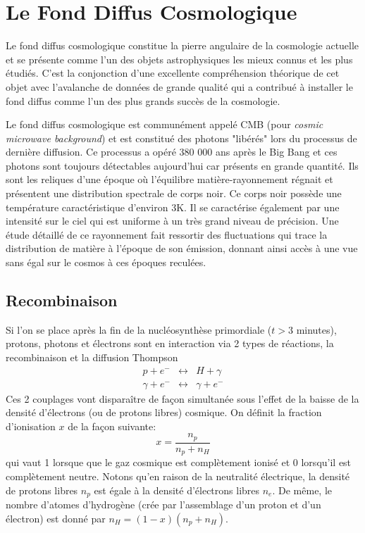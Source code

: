 
\chapter{Le Fond Diffus Cosmologique}

Le fond diffus cosmologique constitue la pierre angulaire de la cosmologie actuelle et se présente comme l'un des objets astrophysiques les mieux connus et les plus étudiés. C'est la conjonction d'une excellente compréhension théorique de cet objet avec l'avalanche de données de grande qualité qui a contribué à installer le fond diffus comme l'un des plus grands succès de la cosmologie.

Le fond diffus cosmologique est communément appelé CMB (pour \textit{cosmic microwave background}) et est constitué des photons "libérés" lors du processus de dernière diffusion. Ce processus a opéré 380 000 ans après le Big Bang et ces photons sont toujours détectables aujourd'hui car présents en grande quantité. Ils sont les reliques d'une époque où l'équilibre matière-rayonnement régnait et présentent une distribution spectrale de corps noir. Ce corps noir possède une température caractéristique d'environ 3K. Il se caractérise également par une intensité sur le ciel qui est uniforme à un très grand niveau de précision. Une étude détaillé de ce rayonnement fait ressortir des fluctuations qui trace la distribution de matière à l'époque de son émission, donnant ainsi accès à une vue sans égal sur le cosmos à ces époques reculées.

\section{Recombinaison}
Si l'on se place après la fin de la nucléosynthèse primordiale ($t>3$ minutes), protons, photons et électrons sont en interaction via 2 types de réactions, la recombinaison et la diffusion Thompson
\begin{eqnarray}
p + e^- &\leftrightarrow& H+ \gamma\label{e:rec}\\
\gamma +e^- &\leftrightarrow& \gamma +e^- 
\end{eqnarray}
Ces 2 couplages vont disparaître de façon simultanée sous l'effet de la baisse de la densité d'électrons (ou de protons libres) cosmique. On définit la fraction d'ionisation $x$ de la façon suivante:
\begin{equation}
x=\frac{n_p}{n_p+n_H}
\end{equation} 
qui vaut 1 lorsque que le gaz cosmique est complètement ionisé et 0 lorsqu'il est complètement neutre. Notons qu'en raison de la neutralité électrique, la densité de protons libres $n_p$ est égale à la densité d'électrons libres $n_e$. De même, le nombre d'atomes d'hydrogène (crée par l'assemblage d'un proton et d'un électron) est donné par $n_H=(1-x) (n_p+n_H)$. 

